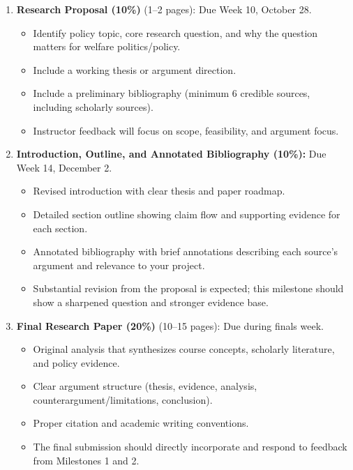 \documentclass[12pt]{article}
\begin{document}
\begin{enumerate}
    \item \textbf{Research Proposal (10\%)} (1--2 pages): Due Week 10, October 28.
    \begin{itemize}
        \item Identify policy topic, core research question, and why the question matters for welfare politics/policy.
        \item Include a working thesis or argument direction.
        \item Include a preliminary bibliography (minimum 6 credible sources, including scholarly sources).
        \item Instructor feedback will focus on scope, feasibility, and argument focus.
    \end{itemize}
    \item \textbf{Introduction, Outline, and Annotated Bibliography (10\%):} Due Week 14, December 2.
    \begin{itemize}
        \item Revised introduction with clear thesis and paper roadmap.
        \item Detailed section outline showing claim flow and supporting evidence for each section.
        \item Annotated bibliography with brief annotations describing each source's argument and relevance to your project.
        \item Substantial revision from the proposal is expected; this milestone should show a sharpened question and stronger evidence base.
    \end{itemize}
    \item \textbf{Final Research Paper (20\%)} (10--15 pages): Due during finals week.
    \begin{itemize}
        \item Original analysis that synthesizes course concepts, scholarly literature, and policy evidence.
        \item Clear argument structure (thesis, evidence, analysis, counterargument/limitations, conclusion).
        \item Proper citation and academic writing conventions.
        \item The final submission should directly incorporate and respond to feedback from Milestones 1 and 2.
    \end{itemize}
\end{enumerate}

\end{document}
